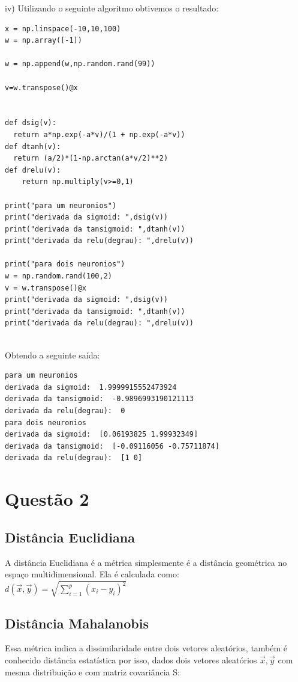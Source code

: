 \documentclass[a4paper, 12pt]{article}
\begin{document}
iv)
Utilizando o seguinte algoritmo obtivemos o resultado:

\begin{lstlisting}[style=Cstyle]
x = np.linspace(-10,10,100)
w = np.array([-1])

w = np.append(w,np.random.rand(99))

v=w.transpose()@x


def dsig(v):
  return a*np.exp(-a*v)/(1 + np.exp(-a*v))
def dtanh(v):
  return (a/2)*(1-np.arctan(a*v/2)**2)
def drelu(v):
    return np.multiply(v>=0,1)

print("para um neuronios")
print("derivada da sigmoid: ",dsig(v))
print("derivada da tansigmoid: ",dtanh(v))
print("derivada da relu(degrau): ",drelu(v))

print("para dois neuronios")
w = np.random.rand(100,2)
v = w.transpose()@x
print("derivada da sigmoid: ",dsig(v))
print("derivada da tansigmoid: ",dtanh(v))
print("derivada da relu(degrau): ",drelu(v))


\end{lstlisting}

Obtendo a seguinte saída:

\begin{lstlisting}
para um neuronios
derivada da sigmoid:  1.9999915552473924
derivada da tansigmoid:  -0.9896993190121113
derivada da relu(degrau):  0
para dois neuronios
derivada da sigmoid:  [0.06193825 1.99932349]
derivada da tansigmoid:  [-0.09116056 -0.75711874]
derivada da relu(degrau):  [1 0]
\end{lstlisting}

\section{Questão 2}

\subsection{Distância Euclidiana}

A distância Euclidiana é a métrica simplesmente é a distância geométrica no espaço multidimensional.
Ela é calculada como: \\

$d(\Vec{x},\Vec{y})=\sqrt{\sum_{i=1}^p (x_i-y_i)^2} $

\subsection{Distância Mahalanobis}
Essa métrica indica a dissimilaridade entre dois vetores aleatórios, também é conhecido 
distância estatística por isso, dados dois vetores aleatórios $\Vec{x},\Vec{y}$ com mesma 
distribuição e com matriz covariância S:\\
\end{document}
